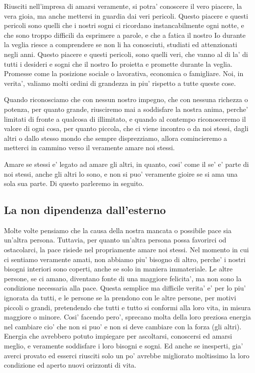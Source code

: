 Riusciti nell'impresa di amarsi veramente, si potra' conoscere il vero piacere, la vera gioia, ma anche mettersi in guardia dai veri pericoli. Questo piacere e questi pericoli sono quelli che i nostri sogni ci ricordano instancabilmente ogni notte, e che sono troppo difficili da esprimere a parole, e che a fatica il nostro Io durante la veglia riesce a comprendere se non li ha conosciuti, studiati ed attenzionati negli anni. Questo piacere e questi pericoli, sono quelli veri, che vanno al di la' di tutti i desideri e sogni che il nostro Io proietta e promette durante la veglia. Promesse come la posizione sociale o lavorativa, economica o famigliare. Noi, in verita', valiamo molti ordini di grandezza in piu' rispetto a tutte queste cose.

Quando riconosciamo che con nessun nostro impegno, che con nessuna richezza o potenza, per quanto grande, riusciremo mai a soddisfare la nostra anima, perche' limitati di fronte a qualcosa di illimitato, e quando al contempo riconosceremo il valore di ogni cosa, per quanto piccola, che ci viene incontro o da noi stessi, dagli altri o dallo stesso mondo che sempre disprezziamo, allora comincieremo a metterci in cammino verso il veramente amare noi stessi.

Amare se stessi e' legato ad amare gli altri, in quanto, cosi' come il se' e' parte di noi stessi, anche gli altri lo sono, e non si puo' veramente gioire se si ama una sola sua parte. Di questo parleremo in seguito.

\subsection{La non dipendenza dall'esterno}

Molte volte pensiamo che la causa della nostra mancata o possibile pace sia un'altra persona. Tuttavia, per quanto un'altra persona possa favorirci od ostacolarci, la pace risiede nel propriamente amare noi stessi. Nel momento in cui ci sentiamo veramente amati, non abbiamo piu' bisogno di altro, perche' i nostri bisogni interiori sono coperti, anche se solo in maniera immateriale. Le altre persone, se ci amano, diventano fonte di una maggiore felicita', ma non sono la condizione necessaria alla pace.
Questa semplice ma difficile verita' e' per lo piu' ignorata da tutti, e le persone se la prendono con le altre persone, per motivi piccoli o grandi, pretendendo che tutti e tutto si conformi alla loro vita, in misura maggiore o minore. Cosi' facendo pero', sprecano molta della loro preziosa energia nel cambiare cio' che non si puo' e non si deve cambiare con la forza (gli altri). Energia che avrebbero potuto impiegare per ascoltarsi, conoscersi ed amarsi meglio, e veramente soddisfare i loro bisogni e sogni. Ed anche se inesperti, gia' averci provato ed esserci riusciti solo un po' avrebbe migliorato moltissimo la loro condizione ed aperto nuovi orizzonti di vita.


